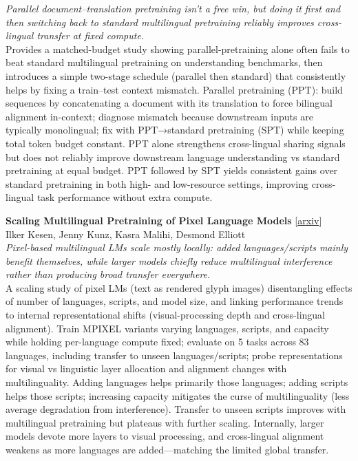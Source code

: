 \documentclass[12pt,letterpaper]{article}
\begin{document}
{\small\textit{Parallel document--translation pretraining isn't a free win, but doing it first and then switching back to standard multilingual pretraining reliably improves cross-lingual transfer at fixed compute.}}\\[1pt]
{\footnotesize Provides a matched-budget study showing parallel-pretraining alone often fails to beat standard multilingual pretraining on understanding benchmarks, then introduces a simple two-stage schedule (parallel then standard) that consistently helps by fixing a train--test context mismatch. Parallel pretraining (PPT): build sequences by concatenating a document with its translation to force bilingual alignment in-context; diagnose mismatch because downstream inputs are typically monolingual; fix with PPT→standard pretraining (SPT) while keeping total token budget constant. PPT alone strengthens cross-lingual sharing signals but does not reliably improve downstream language understanding vs standard pretraining at equal budget. PPT followed by SPT yields consistent gains over standard pretraining in both high- and low-resource settings, improving cross-lingual task performance without extra compute.}

\medskip

{\small\textbf{Scaling Multilingual Pretraining of Pixel Language Models}} {\scriptsize[\href{https://arxiv.org/abs/2610.29681}{arxiv}]}\\
{\scriptsize Ilker Kesen, Jenny Kunz, Kasra Malihi, Desmond Elliott}\\

{\small\textit{Pixel-based multilingual LMs scale mostly locally: added languages/scripts mainly benefit themselves, while larger models chiefly reduce multilingual interference rather than producing broad transfer everywhere.}}\\[1pt]
{\footnotesize A scaling study of pixel LMs (text as rendered glyph images) disentangling effects of number of languages, scripts, and model size, and linking performance trends to internal representational shifts (visual-processing depth and cross-lingual alignment). Train MPIXEL variants varying languages, scripts, and capacity while holding per-language compute fixed; evaluate on 5 tasks across 83 languages, including transfer to unseen languages/scripts; probe representations for visual vs linguistic layer allocation and alignment changes with multilinguality. Adding languages helps primarily those languages; adding scripts helps those scripts; increasing capacity mitigates the curse of multilinguality (less average degradation from interference). Transfer to unseen scripts improves with multilingual pretraining but plateaus with further scaling. Internally, larger models devote more layers to visual processing, and cross-lingual alignment weakens as more languages are added---matching the limited global transfer.}
\end{document}
